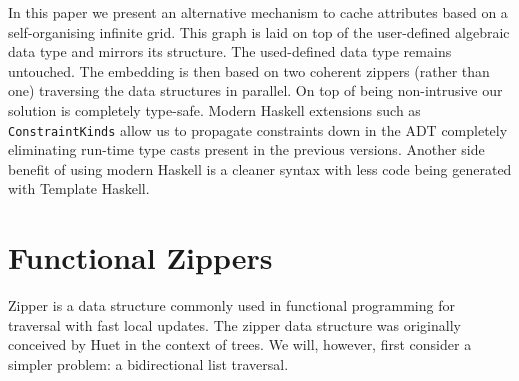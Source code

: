 \documentclass[runningheads]{llncs}
\begin{document}
  In this paper we present an alternative mechanism to cache attributes based on
  a self-organising infinite grid. This graph is laid on top of the user-defined
  algebraic data type and mirrors its structure. The used-defined data type
  remains untouched. The embedding is then based on two coherent zippers (rather
  than one) traversing the data structures in parallel. On top of being
  non-intrusive our solution is completely type-safe. Modern Haskell extensions
  such as \texttt{ConstraintKinds} allow us to propagate constraints down in the
  ADT completely eliminating run-time type casts present in the previous
  versions. Another side benefit of using modern Haskell is a cleaner syntax
  with less code being generated with Template Haskell.


\section{Functional Zippers}
  Zipper is a data structure commonly used in functional programming for
  traversal with fast local updates. The zipper data structure was originally
  conceived by Huet\cite{huet1997zipper} in the context of trees. We will,
  however, first consider a simpler problem: a bidirectional list traversal.
\end{document}
